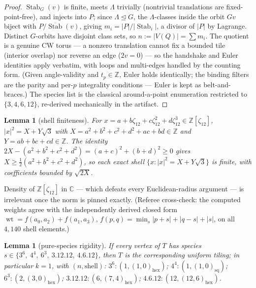 \documentclass[11pt,a4paper,oneside]{article}
\theoremstyle{plain}
\newtheorem{lemma}[theorem]{Lemma}
\theoremstyle{definition}
\theoremstyle{remark}
\DeclareMathOperator{\wt}{wt}
\DeclareMathOperator{\Stab}{Stab}
\newcommand{\ZZ}{\mathbb{Z}}
\newcommand{\CC}{\mathbb{C}}
\newcommand{\zt}[1]{\zeta_{#1}}
\begin{document}
\begin{proof}
$\Stab_G(v)$ is finite, meets $\Lambda$ trivially (nontrivial translations are
fixed-point-free), and injects into $P$; since $\Lambda \trianglelefteq G$, the
$\Lambda$-classes inside the orbit $Gv$ biject with $P/\overline{\Stab}(v)$, giving
$m_i = |P|/|\Stab_i|$, a divisor of $|P|$ by Lagrange. Distinct $G$-orbits have disjoint
class sets, so $n := |V(Q)| = \sum m_i$. The quotient is a genuine CW torus --- a nonzero
translation cannot fix a bounded tile (interior overlap) nor reverse an edge ($2v = 0$) ---
so the handshake and Euler identities apply verbatim, with loops and multi-edges handled by
the counting form. (Given angle-validity and $t_p \in \ZZ$, Euler holds identically; the
binding filters are the parity and per-$p$ integrality conditions --- Euler is kept as
belt-and-braces.) The species list is the classical around-a-point enumeration restricted
to $\{3,4,6,12\}$, re-derived mechanically in the artifact.
\end{proof}

\begin{lemma}[shell finiteness]\label{lem:shell}
For $x = a + b\zt{12} + c\zt{12}^2 + d\zt{12}^3 \in \ZZ[\zt{12}]$,
$|x|^2 = X + Y\sqrt3$ with $X = a^2{+}b^2{+}c^2{+}d^2{+}ac{+}bd \in \ZZ$ and
$Y = ab{+}bc{+}cd \in \ZZ$. The identity
$2X - (a^2{+}b^2{+}c^2{+}d^2) = (a{+}c)^2 + (b{+}d)^2 \ge 0$
gives $X \ge \tfrac12(a^2{+}b^2{+}c^2{+}d^2)$, so each exact shell
$\{x : |x|^2 = X + Y\sqrt3\}$ is finite, with coefficients bounded by $\sqrt{2X}$.
\end{lemma}

Density of $\ZZ[\zt{12}]$ in $\CC$ --- which defeats every Euclidean-radius argument --- is
irrelevant once the norm is pinned exactly. (Referee cross-check: the computed weights agree
with the independently derived closed form
$\wt = f(a_0,a_2) + f(a_1,a_3)$, $f(p,q) = \min_s |p{+}s| + |q{-}s| + |s|$, on all $4{,}140$
shell elements.)

\begin{lemma}[pure-species rigidity]\label{lem:rigid}
If every vertex of $T$ has species $s \in \{3^6,\ 4^4,\ 6^3,\ 3.12.12,\ 4.6.12\}$, then $T$
is the corresponding uniform tiling; in particular $k = 1$, with
$(n, \text{shell})$: $3^6\!: (1, (1,0)_{\mathrm{hex}})$; $4^4\!: (1, (1,0)_{\mathrm{sq}})$;
$6^3\!: (2, (3,0)_{\mathrm{hex}})$; $3.12.12\!: (6, (7,4)_{\mathrm{hex}})$;
$4.6.12\!: (12, (12,6)_{\mathrm{hex}})$.
\end{lemma}
\end{document}
